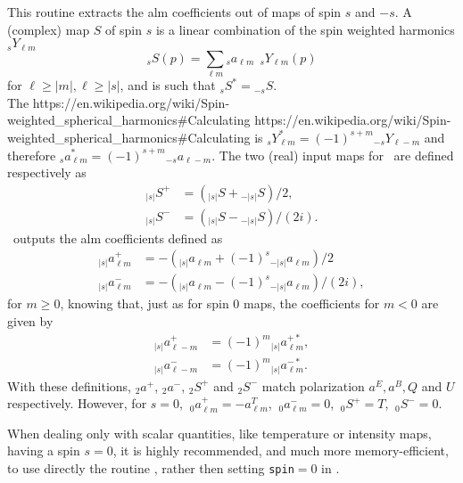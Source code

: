 
\sloppy


 \section[map2alm\_spin*]{ }
\label{sub:map2alm_spin}
\author{Eric Hivon}

\begin{facility}
{This routine extracts the alm coefficients out of maps of spin $s$ and $-s$.
%
A (complex) map $S$ of spin $s$ is a linear combination of the spin weighted harmonics ${_s}Y_{\ell m}$
\begin{equation}
	\label{eq:map2alm_spin_a}
	{_s}S(p) = \sum_{\ell m} {_s}a_{\ell m}\ \ {_s}Y_{\ell m}(p)
\end{equation}
for $\ell \ge |m|, \ell \ge |s|$,
and is such that ${_s}S^* = {_{-s}}S$.\\
The 
%
{https://en.wikipedia.org/wiki/Spin-weighted_spherical_harmonics\#Calculating}%
{https://en.wikipedia.org/wiki/Spin-weighted_spherical_harmonics\#Calculating}
is
${_s}Y_{\ell m}^* = (-1)^{s+m} {_{-s}}Y_{\ell -m}$
and therefore 
${_s}a_{\ell m}^* = (-1)^{s+m} {_{-s}}a_{\ell -m}$.
%
The two (real) input maps for \thedocid\ are defined respectively as
\begin{align}
	\label{eq:map2alm_spin_b}
	{_{|s|}}S^+ &= ({_{|s|}}S + {_{-|s|}}S)/2,\\
	{_{|s|}}S^- &= ({_{|s|}}S - {_{-|s|}}S)/(2i).
\end{align}
%
\thedocid\ outputs the alm coefficients defined as
\begin{align}
	\label{eq:map2alm_spin_c}
	{_{|s|}}a^{+}_{\ell m} &= - ( {_{|s|}}a_{\ell m} + (-1)^s {_{-|s|}}a_{\ell m} )/2\\
	{_{|s|}}a^{-}_{\ell m} &= - ( {_{|s|}}a_{\ell m} - (-1)^s {_{-|s|}}a_{\ell m} )/(2i),
\end{align}
for $m\ge 0$, knowing that, just as for spin 0 maps, the
coefficients for $m<0$ are given by 
\begin{align}
	\label{eq:map2alm_spin_c}
	{_{|s|}}a^{+}_{\ell-m} &= (-1)^m {_{|s|}}a^{+*}_{\ell m},\\
	{_{|s|}}a^{-}_{\ell-m} &= (-1)^m {_{|s|}}a^{-*}_{\ell m}.
\end{align}
%
With these definitions, ${_2}a^{+}$, ${_2}a^{-}$, ${_2}S^+$ and ${_2}S^-$
match \healpix  polarization $a^E, a^B, Q$ and $U$ respectively. However, for
$s=0$, $\ _{0}a^+_{\ell m} = -a^T_{\ell m}$, $\ _{0}a^-_{\ell m} = 0$, $\ {_0}S^+ = T$, $\
{_0}S^- = 0.$

When dealing only with scalar quantities, like temperature or intensity maps, having a spin $s=0$, it is
highly recommended, and much more memory-efficient, to use directly the routine , rather then setting \texttt{spin}$=0$ in \thedocid.
}
{\modAlmTools}
\end{facility}

